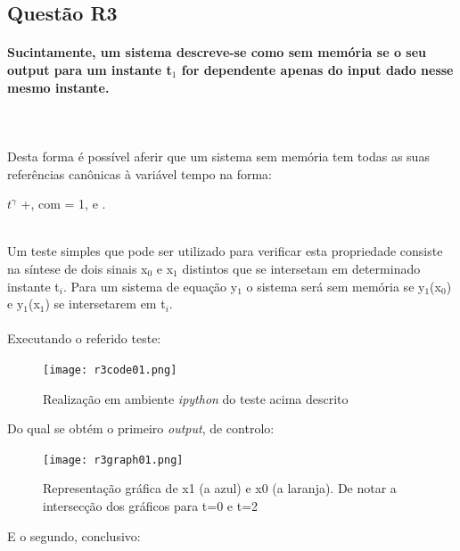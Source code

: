 \documentclass[a4paper,12pt]{article}
\begin{document}
	\subsection{Questão R3}
		\paragraph{Sucintamente, um sistema descreve-se como sem memória se o seu output para um instante t$_1$ for dependente apenas do input dado nesse mesmo instante.}
		\mbox{}\\
		\mbox{}\\
		Desta forma é possível aferir que um sistema sem memória tem todas as suas referências canônicas à variável tempo na forma:
		\\ 
		\begin{center}
			\textalpha $t^{\gamma}$ +\textbeta , com \textalpha = 1,  e .
		\end{center}
		\\
		Um teste simples que pode ser utilizado para verificar esta propriedade consiste na síntese de dois sinais x$_0$ e x$_1$ distintos que se intersetam em determinado instante t$_i$. Para um sistema de equação y$_1$ o sistema será sem memória se y$_1$(x$_0$) e y$_1$(x$_1$) se intersetarem em t$_i$.
		\mbox{}\\
		\mbox{}\\
		Executando o referido teste:
		\begin{figure}[H]
      			\centering
      			\captionsetup{justification=centering}
      			\texttt{[image: r3code01.png]}
			\caption{Realização em ambiente \textit{ipython} do teste acima descrito}
      		\end{figure}
		Do qual se obtém o primeiro \textit{output}, de controlo:
		\begin{figure}[H]
        		\centering
        		\captionsetup{justification=centering}
        		\texttt{[image: r3graph01.png]}
			\caption{Representação gráfica de x1 (a azul) e x0 (a laranja). De notar a intersecção dos gráficos para t=0 e t=2}
        	\end{figure}
		E o segundo, conclusivo:
\end{document}
